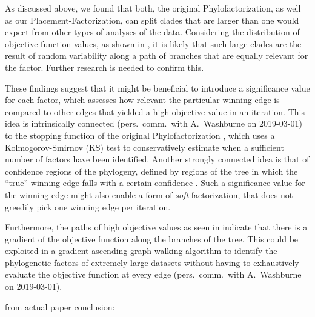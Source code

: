 As discussed above, we found that both, the original Phylofactorization, as well as our Placement-Factorization,
can split clades that are larger than one would expect from other types of analyses of the data.
Considering the distribution of objective function values, as shown in ,
it is likely that such large clades are the result of random variability
along a path of branches that are equally relevant for the factor.
Further research is needed to confirm this.

These findings suggest that it might be beneficial to introduce a significance value for each factor,
which assesses how relevant the particular winning edge is
compared to other edges that yielded a high objective value in an iteration.
This idea is intrinsically connected (pers.~comm.~with A.~Washburne on 2019-03-01)
to the stopping function of the original Phylofactorization \cite{Washburne2017a},
which uses a Kolmogorov-Smirnov (KS) test %
to conservatively estimate when a sufficient number of factors have been identified.
Another strongly connected idea is that of confidence regions of the phylogeny,
defined by regions of the tree in which the ``true'' winning edge falls with a certain confidence \cite{Washburne2019}.
Such a significance value for the winning edge might also enable a form of \emph{soft} factorization,
that does not greedily pick one winning edge per iteration.

Furthermore, the paths of high objective values as seen in  indicate
that there is a gradient of the objective function along the branches of the tree.
This could be exploited in a gradient-ascending graph-walking algorithm to identify the phylogenetic factors
of extremely large datasets without having to exhaustively evaluate the objective function at every edge
(pers.~comm.~with A.~Washburne on 2019-03-01).



from actual paper conclusion:

